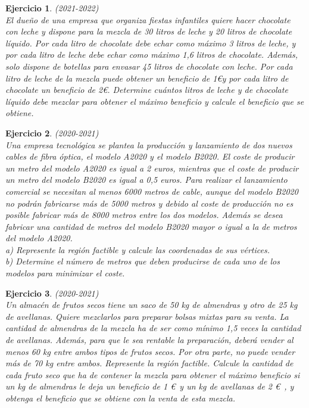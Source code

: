 \documentclass[12pt, a4paper]{amsart}
\newtheorem{ejer}{Ejercicio}
\begin{document}
\begin{ejer}\em (2021-2022)\\
El dueño de una empresa que organiza fiestas infantiles quiere hacer chocolate con leche y dispone para la mezcla de 30 litros de leche y 20 litros de chocolate líquido. Por cada litro de chocolate
debe echar como máximo 3 litros de leche, y por cada litro de leche debe echar como máximo 1,6 litros de chocolate. Además, solo dispone de botellas para envasar 45 litros de chocolate con leche. Por cada litro de leche de la mezcla puede obtener un beneficio de 1\euro y por cada litro de chocolate un beneficio de 2\euro. Determine cuántos litros de leche y de chocolate líquido debe mezclar para obtener el máximo beneficio y calcule el beneficio que se obtiene.
\end{ejer}

\begin{ejer}\em (2020-2021)\\
Una empresa tecnológica se plantea la producción y lanzamiento de dos nuevos cables de fibra óptica, el modelo A2020 y el modelo B2020. El coste de producir un metro del modelo A2020 es igual a 2 euros, mientras que el coste de producir un metro del modelo B2020 es igual a 0,5 euros. Para realizar el lanzamiento comercial se necesitan al menos 6000 metros de cable, aunque del modelo B2020 no podrán fabricarse más de 5000 metros y debido al coste de producción no es posible fabricar más de 8000 metros entre los dos modelos. Además se desea fabricar una cantidad de metros del modelo B2020 mayor o igual a la de metros del modelo A2020.\\
a) Represente la región factible y calcule las coordenadas de sus vértices.\\
b) Determine el número de metros que deben producirse de cada uno de los modelos para minimizar el coste.
\end{ejer}

\newpage

\begin{ejer}\em (2020-2021)\\
Un almacén de frutos secos tiene un saco de 50 kg de almendras y otro de 25 kg de avellanas. Quiere mezclarlos para preparar bolsas mixtas para su venta. La cantidad de almendras de la mezcla ha de ser como mínimo 1,5 veces la cantidad de avellanas. Además, para que le sea rentable la preparación, deberá vender al menos 60 kg entre ambos tipos de frutos secos. Por otra parte, no puede vender más de 70 kg entre ambos. Represente la región factible. Calcule la cantidad de cada fruto seco que ha de contener la mezcla para obtener el máximo beneficio si un kg de almendras le deja un beneficio de 1 \euro\ y un kg de avellanas de 2 \euro\ , y obtenga el beneficio que se obtiene con la venta de esta mezcla.
\end{ejer}
\end{document}
